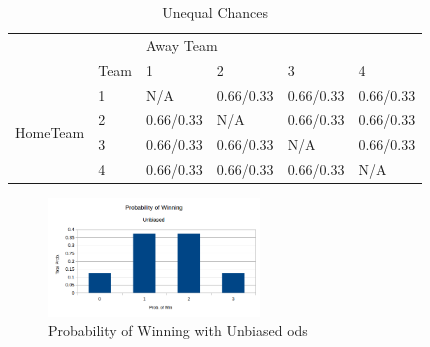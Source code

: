 \documentclass[12pt]{article}
\begin{document}
\begin{table}[H]
\centering
\caption{Unequal Chances}
\label{my-label}
\begin{tabular}{ll|l|l|l|l|}
\cline{3-6}
                                                &      & \multicolumn{4}{l|}{Away Team}    \\ \cline{2-6} 
\multicolumn{1}{l|}{}                           & Team & 1      & 2      & 3      & 4      \\ \hline
\multicolumn{1}{|l|}{\multirow{4}{*}{HomeTeam}} & 1    & N/A    & 0.66/0.33 & 0.66/0.33 & 0.66/0.33 \\ \cline{2-6} 
\multicolumn{1}{|l|}{}                          & 2    & 0.66/0.33 & N/A    & 0.66/0.33 & 0.66/0.33 \\ \cline{2-6} 
\multicolumn{1}{|l|}{}                          & 3    & 0.66/0.33 & 0.66/0.33 & N/A    & 0.66/0.33 \\ \cline{2-6} 
\multicolumn{1}{|l|}{}                          & 4    & 0.66/0.33 & 0.66/0.33 & 0.66/0.33 & N/A    \\ \hline
\end{tabular}
\end{table}

\begin{figure}[H]
\centering
\includegraphics[width=0.5\textwidth]{win_u.png}
\caption{Probability of Winning with Unbiased ods}
\end{figure}
\end{document}
